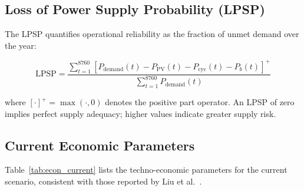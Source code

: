 \documentclass[journal]{IEEEtran}
\begin{document}
\subsection{Loss of Power Supply Probability (LPSP)}

The LPSP quantifies operational reliability as the fraction of unmet demand over the year:

\begin{equation}
\text{LPSP} = \frac{\displaystyle\sum_{t=1}^{8760} \left[P_{\text{demand}}(t) - P_{\text{PV}}(t) - P_{\text{cyc}}(t) - P_b(t)\right]^+}{\displaystyle\sum_{t=1}^{8760} P_{\text{demand}}(t)}
\label{eq:lpsp}
\end{equation}

where $[\cdot]^+ = \max(\cdot, 0)$ denotes the positive part operator. An LPSP of zero implies perfect supply adequacy; higher values indicate greater supply risk.

\subsection{Current Economic Parameters}

Table~\ref{tab:econ_current} lists the techno-economic parameters for the current scenario, consistent with those reported by Liu et al.~\cite{liu2022}.
\end{document}
